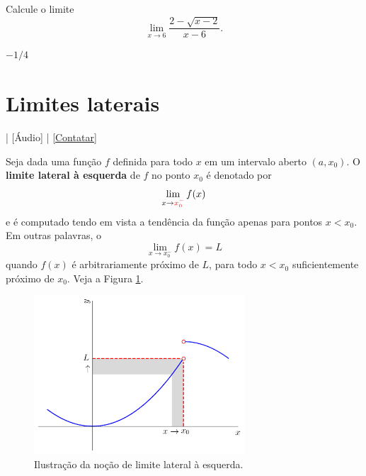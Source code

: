 \begin{exer}
  Calcule o limite
  \begin{equation}
    \lim_{x\to 6} \frac{2-\sqrt{x-2}}{x-6}.
  \end{equation}
\end{exer}
\begin{resp}
  $-1/4$
\end{resp}


\section{Limites laterais}\label{cap_lim_sec_lateral}

\begin{flushright}
  [Vídeo] | [Áudio] | \href{https://phkonzen.github.io/notas/contato.html}{[Contatar]}
\end{flushright}

Seja dada uma função $f$ definida para todo $x$ em um intervalo aberto $(a, x_0)$. O {\bf limite lateral à esquerda} de $f$ no ponto $x_0$ é denotado por
\begin{equation}
  \lim_{x\to {\color{red}x_0^-}} f(x)
\end{equation}
e é computado tendo em vista a tendência da função apenas para pontos $x<x_0$. Em outras palavras, o
\begin{equation}
  \lim_{x\to x_0^-} f(x) = L
\end{equation}
quando $f(x)$ é arbitrariamente próximo de $L$, para todo $x<x_0$ suficientemente próximo de $x_0$. Veja a Figura \ref{fig:lim_esq}.

\begin{figure}[H]
  \centering
  \includegraphics[width=0.7\textwidth]{./cap_lim/dados/fig_lim_esq/fig_lim_esq}
  \caption{Ilustração da noção de limite lateral à esquerda.}
  \label{fig:lim_esq}
\end{figure}

